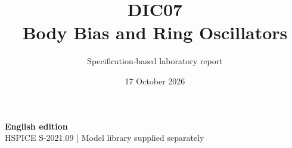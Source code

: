 \documentclass[11pt,a4paper]{article}
\title{\color{accent}DIC07\\[4pt]Body Bias and Ring Oscillators}
\author{Specification-based laboratory report}
\date{17 October 2026}
\begin{document}
\maketitle
\begin{center}\small\textbf{English edition}\\
HSPICE S-2021.09 \quad | \quad Model library supplied separately
\end{center}


\end{document}
